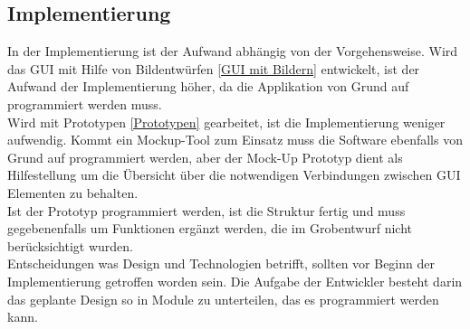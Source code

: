 \documentclass[12pt,a4paper]{article}
\begin{document}
\subsection{Implementierung}
In der Implementierung ist der Aufwand abhängig von der Vorgehensweise. Wird das GUI mit Hilfe von Bildentwürfen \ref{GUI mit Bildern} entwickelt, ist der Aufwand der Implementierung höher, da die Applikation von Grund auf programmiert werden muss. \\
Wird mit Prototypen \ref{Prototypen} gearbeitet, ist die Implementierung weniger aufwendig. Kommt ein Mockup-Tool zum Einsatz muss die Software ebenfalls von Grund auf programmiert werden, aber der Mock-Up Prototyp dient als Hilfestellung um die Übersicht über die notwendigen Verbindungen zwischen GUI Elementen zu behalten.\\
Ist der Prototyp programmiert werden, ist die Struktur fertig und muss gegebenenfalls um Funktionen ergänzt werden, die im Grobentwurf nicht berücksichtigt wurden. \\
Entscheidungen was Design und Technologien betrifft, sollten vor Beginn der Implementierung getroffen worden sein. Die Aufgabe der Entwickler besteht darin das geplante Design so in Module zu unterteilen, das es programmiert werden kann\cite{rakos1990software}. 
\end{document}
